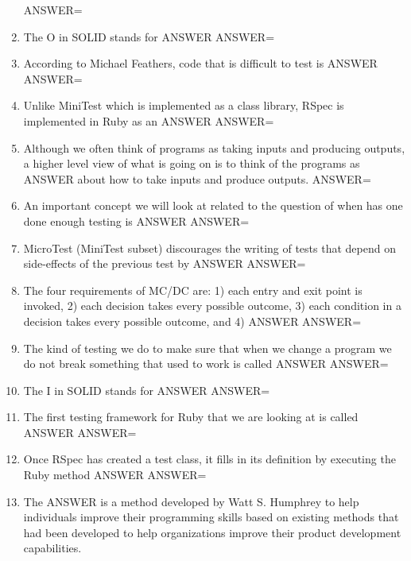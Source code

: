 \documentclass{exam}
\begin{document}
\begin{enumerate}
ANSWER=
\item The O in SOLID stands for ANSWER\newline
ANSWER=
\item According to Michael Feathers, code that is difficult to test is ANSWER\newline
ANSWER=
\item Unlike MiniTest which is implemented as a class library, RSpec is implemented in Ruby as an ANSWER\newline
ANSWER=
\item Although we often think of programs as taking inputs and producing outputs, a higher level view of what is going on is to think of the programs as ANSWER about how to take inputs and produce outputs.\newline
ANSWER=
\item An important concept we will look at related to the question of when has one done enough testing is ANSWER\newline
ANSWER=
\item MicroTest (MiniTest subset) discourages the writing of tests that depend on side-effects of the previous test by ANSWER\newline
ANSWER=
\item The four requirements of MC/DC are: 1) each entry and exit point is invoked, 2) each decision takes every possible outcome, 3) each condition in a decision takes every possible outcome, and 4) ANSWER\newline
ANSWER=
\item The kind of testing we do to make sure that when we change a program we do not break something that used to work is called ANSWER\newline
ANSWER=
\item The I in SOLID stands for ANSWER\newline
ANSWER=
\item The first testing framework for Ruby that we are looking at is called ANSWER\newline
ANSWER=
\item Once RSpec has created a test class, it fills in its definition by executing the Ruby method ANSWER\newline
ANSWER=
\item The ANSWER is a method developed by Watt S. Humphrey to help individuals improve their programming skills based on existing methods that had been developed to help organizations improve their product development capabilities.\newline

\end{enumerate}
\end{document}
